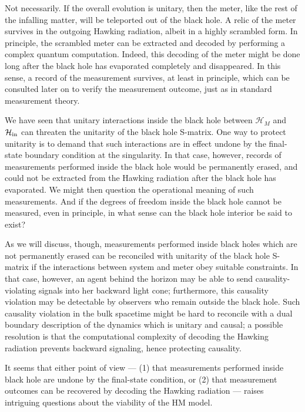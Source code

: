 \documentclass[11pt]{article}
\begin{document}
Not necessarily. If the overall evolution is unitary, then the meter, like the rest of the infalling matter, will be teleported out of the black hole. A relic of the meter survives in the outgoing Hawking radiation, albeit in a highly scrambled form. In principle, the scrambled meter can be extracted and decoded by performing a complex quantum computation. Indeed, this decoding of the meter might be done long after the black hole has evaporated completely and disappeared. In this sense, a record of the measurement survives, at least in principle, which can be consulted later on to verify the measurement outcome, just as in standard measurement theory. 

We have seen that unitary interactions inside the black hole between $\mathcal{H}_M$ and $\mathcal{H}_{\rm in}$ can threaten the unitarity of the black hole S-matrix. One way to protect unitarity is to demand that such interactions are in effect undone by the final-state boundary condition at the singularity. In that case, however, records of measurements performed inside the black hole would be permanently erased, and could not be extracted from the Hawking radiation after the black hole has evaporated. We might then question the operational meaning of such measurements. And if the degrees of freedom inside the black hole cannot be measured, even in principle, in what sense can the black hole interior be said to exist?

As we will discuss, though, measurements performed inside black holes which are not permanently erased can be reconciled with unitarity of the black hole S-matrix if the interactions between system and meter obey suitable constraints. In that case, however, an agent behind the horizon may be able to send causality-violating signals into her backward light cone; furthermore, this causality violation may be detectable by observers who remain outside the black hole. Such causality violation in the bulk spacetime might be hard to reconcile with a dual boundary description of the dynamics which is unitary and causal; a possible resolution is that the computational complexity of decoding the Hawking radiation \cite{harlow-hayden} prevents backward signaling, hence protecting causality.

It seems that either point of view --- (1) that measurements performed inside black hole are undone by the final-state condition, or (2) that measurement outcomes can be recovered by decoding the Hawking radiation --- raises intriguing questions about the viability of the HM model. 
\end{document}
